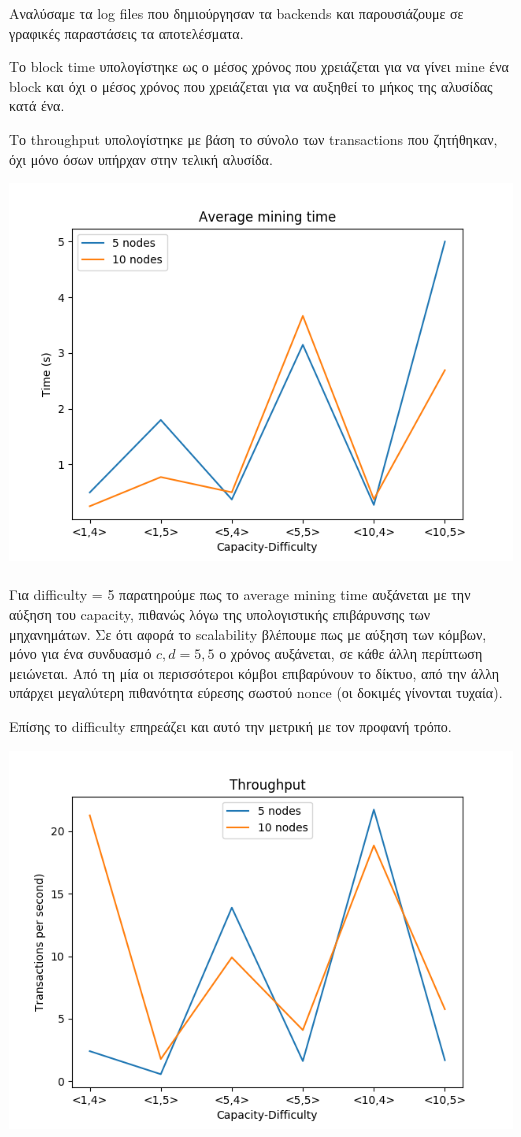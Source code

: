 \documentclass[a4paper,oneside, 12pt]{article}
\begin{document}
Αναλύσαμε τα log files που δημιούργησαν τα backends και παρουσιάζουμε σε γραφικές παραστάσεις τα αποτελέσματα.

Το block time υπολογίστηκε ως ο μέσος χρόνος που χρειάζεται για να γίνει mine ένα block και όχι ο μέσος χρόνος που χρειάζεται για να αυξηθεί το μήκος της αλυσίδας κατά ένα.


Το throughput υπολογίστηκε με βάση το σύνολο των transactions που ζητήθηκαν, όχι μόνο όσων υπήρχαν στην τελική αλυσίδα.


\includegraphics{avg_mine_time}

\paragraph{}
Για difficulty = 5 παρατηρούμε πως το average mining time αυξάνεται με την αύξηση του capacity, πιθανώς λόγω της υπολογιστικής επιβάρυνσης των μηχανημάτων. Σε ότι αφορά το scalability βλέπουμε πως με αύξηση των κόμβων, μόνο για ένα συνδυασμό $c,d = 5,5$ ο χρόνος αυξάνεται, σε κάθε άλλη περίπτωση μειώνεται. Από τη μία οι περισσότεροι κόμβοι επιβαρύνουν το δίκτυο, από την άλλη υπάρχει μεγαλύτερη πιθανότητα εύρεσης σωστού nonce (οι δοκιμές γίνονται τυχαία).

Επίσης το difficulty επηρεάζει και αυτό την μετρική με τον προφανή τρόπο.

\includegraphics{tput}
\end{document}
